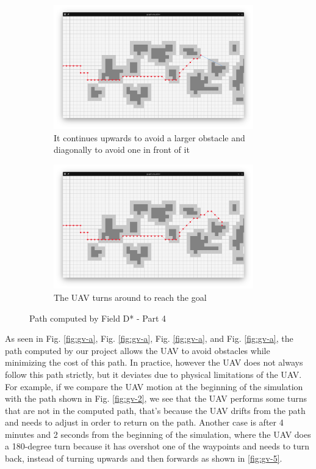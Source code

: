 \begin{figure}
	\begin{center}
		\begin{subfigure}[t]{\textwidth}
			\includegraphics[width=0.95\textwidth]{./img/gv_7.png}
			\caption{It continues upwards to avoid a larger obstacle and diagonally to avoid one in front of it}\label{fig:gv-7}
		\end{subfigure}
		\begin{subfigure}[t]{\textwidth}
			\includegraphics[width=0.95\textwidth]{./img/gv_8.png}
			\caption{The UAV turns around to reach the goal}\label{fig:gv-8}
		\end{subfigure}
	\end{center}
	\caption{Path computed by Field D* - Part 4}\label{fig:gv-d}
\end{figure}

As seen in Fig. \ref{fig:gv-a}, Fig. \ref{fig:gv-a}, Fig. \ref{fig:gv-a}, and Fig. \ref{fig:gv-a}, the path
computed by our project allows the UAV to avoid obstacles while minimizing the cost of this path. In practice,
however the UAV does not always follow this path strictly, but it deviates due to physical limitations of the 
UAV. For example, if we compare the UAV motion at the beginning of the simulation with the path shown in 
Fig. \ref{fig:gv-2}, we see that the UAV performs some turns that are not in the computed path, that's because
the UAV drifts from the path and needs to adjust in order to return on the path. Another case is after 4 minutes
and 2 seconds from the beginning of the simulation, where the UAV does a 180-degree turn because it has overshot
one of the waypoints and needs to turn back, instead of turning upwards and then forwards as shown in \ref{fig:gv-5}.

